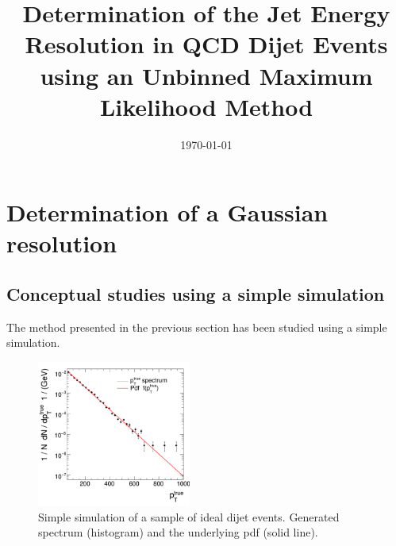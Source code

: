 \documentclass[a4paper]{cmspaper} %
\begin{document}
\begin{titlepage}
  \date{\today}
  \title{Determination of the Jet Energy Resolution in QCD Dijet
    Events using an Unbinned Maximum Likelihood Method}
\end{titlepage}
\tableofcontents









\section{Determination of a Gaussian resolution}
\subsection{Conceptual studies using a simple simulation}
The method presented in the previous section has been studied using a
simple simulation.

\begin{figure}[ht]
  \begin{center}
     \includegraphics[width=0.45\textwidth]{figures/resFit_ToyMC_PtGenCuts_SpectrumLog}
   \end{center}
   \caption{Simple simulation of a sample of ideal dijet events.
     Generated \pttrue spectrum (histogram) and the underlying pdf (solid line).}
   \label{fig:resFit:toyMC:ptGenCuts:spectrum}
\end{figure}
\end{document}
